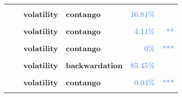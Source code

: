 \documentclass[
  authoryear,
  preprint,
  3p]{elsarticle}
\begin{document}
\begin{longtable}[t]{>{}l>{}l>{}l>{}l>{}r>{}r}
\textbf{\cellcolor{gray!10}{Lead-refined pig (XLME)}} & \textbf{\cellcolor{gray!10}{past}} & \textbf{\cellcolor{gray!10}{mean}} & \textbf{\cellcolor{gray!10}{backwardation}} & \textcolor[HTML]{4285f4}{\cellcolor{gray!10}{58.96\%}} & \textcolor[HTML]{4285f4}{\cellcolor{gray!10}{}}\\
\textbf{} & \textbf{} & \textbf{volatility} & \textbf{contango} & \textcolor[HTML]{4285f4}{16.81\%} & \textcolor[HTML]{4285f4}{}\\
\addlinespace
\textbf{\cellcolor{gray!10}{}} & \textbf{\cellcolor{gray!10}{financialisation}} & \textbf{\cellcolor{gray!10}{mean}} & \textbf{\cellcolor{gray!10}{contango}} & \textcolor[HTML]{4285f4}{\cellcolor{gray!10}{40.11\%}} & \textcolor[HTML]{4285f4}{\cellcolor{gray!10}{}}\\
\textbf{} & \textbf{} & \textbf{volatility} & \textbf{contango} & \textcolor[HTML]{4285f4}{4.11\%} & \textcolor[HTML]{4285f4}{**}\\
\textbf{\cellcolor{gray!10}{}} & \textbf{\cellcolor{gray!10}{crisis}} & \textbf{\cellcolor{gray!10}{mean}} & \textbf{\cellcolor{gray!10}{contango}} & \textcolor[HTML]{4285f4}{\cellcolor{gray!10}{93.17\%}} & \textcolor[HTML]{4285f4}{\cellcolor{gray!10}{}}\\
\textbf{} & \textbf{} & \textbf{volatility} & \textbf{contango} & \textcolor[HTML]{4285f4}{0\%} & \textcolor[HTML]{4285f4}{\vphantom{7} ***}\\
\textbf{\cellcolor{gray!10}{}} & \textbf{\cellcolor{gray!10}{post-crisis}} & \textbf{\cellcolor{gray!10}{mean}} & \textbf{\cellcolor{gray!10}{backwardation}} & \textcolor[HTML]{4285f4}{\cellcolor{gray!10}{15.62\%}} & \textcolor[HTML]{4285f4}{\cellcolor{gray!10}{}}\\
\addlinespace
\textbf{} & \textbf{} & \textbf{volatility} & \textbf{backwardation} & \textcolor[HTML]{4285f4}{85.45\%} & \textcolor[HTML]{4285f4}{}\\
\textbf{\cellcolor{gray!10}{Nickel-primary (XLME)}} & \textbf{\cellcolor{gray!10}{past}} & \textbf{\cellcolor{gray!10}{mean}} & \textbf{\cellcolor{gray!10}{backwardation}} & \textcolor[HTML]{4285f4}{\cellcolor{gray!10}{76.56\%}} & \textcolor[HTML]{4285f4}{\cellcolor{gray!10}{}}\\
\textbf{} & \textbf{} & \textbf{volatility} & \textbf{contango} & \textcolor[HTML]{4285f4}{0.04\%} & \textcolor[HTML]{4285f4}{***}\\
\textbf{\cellcolor{gray!10}{}} & \textbf{\cellcolor{gray!10}{financialisation}} & \textbf{\cellcolor{gray!10}{mean}} & \textbf{\cellcolor{gray!10}{contango}} & \textcolor[HTML]{4285f4}{\cellcolor{gray!10}{1.24\%}} & \textcolor[HTML]{4285f4}{\cellcolor{gray!10}{**}}\\

\end{longtable}
\end{document}
